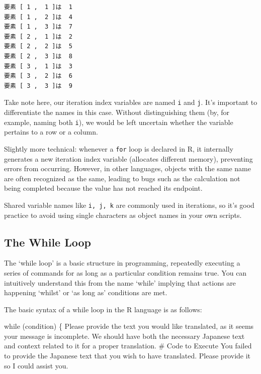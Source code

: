 \documentclass[
  a4paper,
]{book}
\newenvironment{Shaded}{\begin{snugshade}}{\end{snugshade}}
\newcommand{\CommentTok}[1]{\textcolor[rgb]{0.37,0.37,0.37}{#1}}
\newcommand{\ControlFlowTok}[1]{\textcolor[rgb]{0.00,0.23,0.31}{#1}}
\newcommand{\NormalTok}[1]{\textcolor[rgb]{0.00,0.23,0.31}{#1}}
\begin{document}
\begin{verbatim}
要素 [ 1 ,  1 ]は  1 
要素 [ 1 ,  2 ]は  4 
要素 [ 1 ,  3 ]は  7 
要素 [ 2 ,  1 ]は  2 
要素 [ 2 ,  2 ]は  5 
要素 [ 2 ,  3 ]は  8 
要素 [ 3 ,  1 ]は  3 
要素 [ 3 ,  2 ]は  6 
要素 [ 3 ,  3 ]は  9 
\end{verbatim}

Take note here, our iteration index variables are named \texttt{i} and
\texttt{j}. It's important to differentiate the names in this case.
Without distinguishing them (by, for example, naming both \texttt{i}),
we would be left uncertain whether the variable pertains to a row or a
column.

Slightly more technical: whenever a \texttt{for} loop is declared in R,
it internally generates a new iteration index variable (allocates
different memory), preventing errors from occurring. However, in other
languages, objects with the same name are often recognized as the same,
leading to bugs such as the calculation not being completed because the
value has not reached its endpoint.

Shared variable names like \texttt{i,\ j,\ k} are commonly used in
iterations, so it's good practice to avoid using single characters as
object names in your own scripts.

\subsection{The While Loop}\label{the-while-loop}

The `while loop' is a basic structure in programming, repeatedly
executing a series of commands for as long as a particular condition
remains true. You can intuitively understand this from the name `while'
implying that actions are happening `whilst' or `as long as' conditions
are met.

The basic syntax of a while loop in the R language is as follows:

\begin{Shaded}
\begin{Highlighting}[]
\ControlFlowTok{while}\NormalTok{ (condition) \{}
\NormalTok{Please provide the text you would like translated, as it seems your message is incomplete. We should have both the necessary Japanese text and context related to it }\ControlFlowTok{for}\NormalTok{ a proper translation.}
    \CommentTok{\# Code to Execute}
\NormalTok{You failed to provide the Japanese text that you wish to have translated. Please provide it so I could assist you.}
\end{Highlighting}
\end{Shaded}
\end{document}
